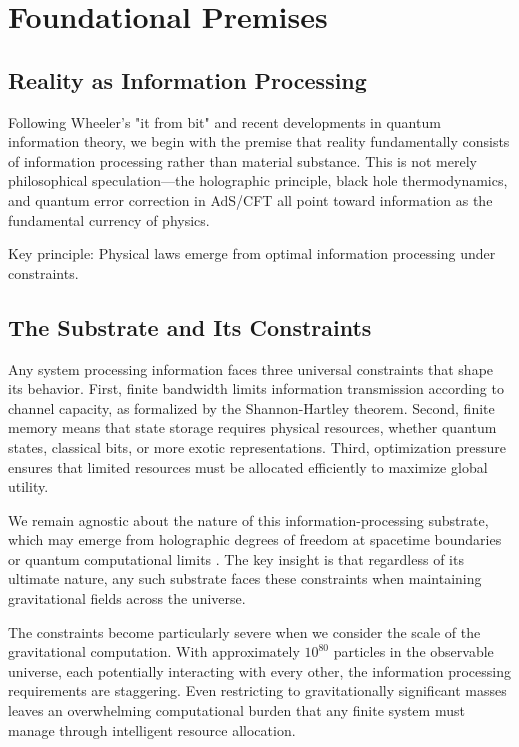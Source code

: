 \documentclass[usenatbib]{mnras}
\begin{document}
\section{Foundational Premises}
\label{sec:foundations}

\subsection{Reality as Information Processing}

Following Wheeler's "it from bit" and recent developments in quantum information theory, we begin with the premise that reality fundamentally consists of information processing rather than material substance. This is not merely philosophical speculation---the holographic principle, black hole thermodynamics, and quantum error correction in AdS/CFT all point toward information as the fundamental currency of physics.

Key principle: Physical laws emerge from optimal information processing under constraints.

\subsection{The Substrate and Its Constraints}

Any system processing information faces three universal constraints that shape its behavior. First, finite bandwidth limits information transmission according to channel capacity, as formalized by the Shannon-Hartley theorem. Second, finite memory means that state storage requires physical resources, whether quantum states, classical bits, or more exotic representations. Third, optimization pressure ensures that limited resources must be allocated efficiently to maximize global utility.

We remain agnostic about the nature of this information-processing substrate, which may emerge from holographic degrees of freedom at spacetime boundaries \citep{susskind1995} or quantum computational limits \citep{lloyd2002}. The key insight is that regardless of its ultimate nature, any such substrate faces these constraints when maintaining gravitational fields across the universe.

The constraints become particularly severe when we consider the scale of the gravitational computation. With approximately $10^{80}$ particles in the observable universe, each potentially interacting with every other, the information processing requirements are staggering. Even restricting to gravitationally significant masses leaves an overwhelming computational burden that any finite system must manage through intelligent resource allocation.
\end{document}
